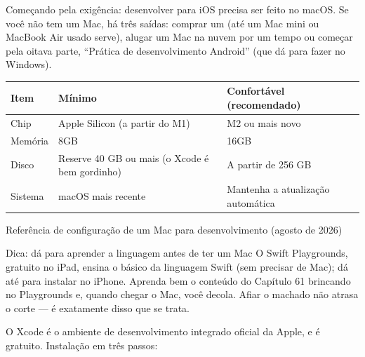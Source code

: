 


Começando pela exigência: desenvolver para iOS precisa ser feito no macOS. Se você não tem um Mac, há três saídas: comprar um (até um Mac mini ou MacBook Air usado serve), alugar um Mac na nuvem por um tempo ou começar pela oitava parte, “Prática de desenvolvimento Android” (que dá para fazer no Windows).

\begin{center}
\begin{tabularx}{\linewidth}{|X|X|X|}
\hline
\textbf{Item} & \textbf{Mínimo} & \textbf{Confortável (recomendado)} \tabularnewline
\hline
Chip & Apple Silicon (a partir do M1) & M2 ou mais novo \tabularnewline
Memória & 8GB & 16GB \tabularnewline
Disco & Reserve 40 GB ou mais (o Xcode é bem gordinho) & A partir de 256 GB \tabularnewline
Sistema & macOS mais recente & Mantenha a atualização automática \tabularnewline
\hline
\end{tabularx}
\end{center}

\begin{center}\small\color{gray}Referência de configuração de um Mac para desenvolvimento (agosto de 2026)\end{center}

\begin{tcbinfo}{Dica: dá para aprender a linguagem antes de ter um Mac}
O Swift Playgrounds, gratuito no iPad, ensina o básico da linguagem Swift (sem precisar de Mac); dá até para instalar no iPhone. Aprenda bem o conteúdo do Capítulo 61 brincando no Playgrounds e, quando chegar o Mac, você decola. Afiar o machado não atrasa o corte — é exatamente disso que se trata.

\end{tcbinfo}


O Xcode é o ambiente de desenvolvimento integrado oficial da Apple, e é gratuito. Instalação em três passos:

